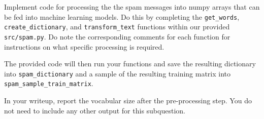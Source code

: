 \item {}
Implement code for processing the the spam messages into numpy arrays that can be fed into machine learning models. Do this by completing the \texttt{get\_words}, \texttt{create\_dictionary}, and \texttt{transform\_text} functions within our provided \texttt{src/spam.py}. Do note the corresponding comments for each function for instructions on what specific processing is required.

The provided code will then run your functions and save the resulting dictionary into \texttt{spam\_dictionary} and a sample of the resulting training matrix into\\
\texttt{spam\_sample\_train\_matrix}.


In your writeup, report the vocabular size after the pre-processing step. You do not need to include any other output for this subquestion.\\[50pt]